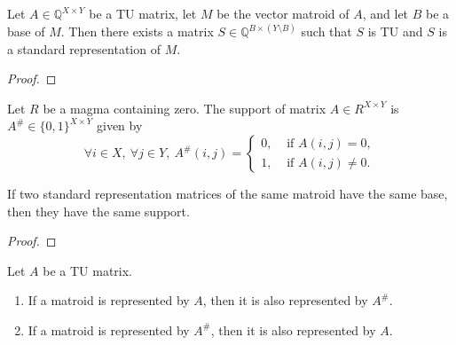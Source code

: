 
\begin{lemma}
    \label{VectorMatroid.exists_standardRepr_isBase_isTotallyUnimodular}
    \leanok
    Let $A \in \mathbb{Q}^{X \times Y}$ be a TU matrix, let $M$ be the vector matroid of $A$, and let $B$ be a base of $M$. Then there exists a matrix $S \in \mathbb{Q}^{B \times (Y \setminus B)}$ such that $S$ is TU and $S$ is a standard representation of $M$.
\end{lemma}

\begin{proof}
    \leanok
    \SeeLean
\end{proof}


\begin{definition}
    \label{Matrix.support}
    \leanok
    Let $R$ be a magma containing zero. The support of matrix $A \in R^{X \times Y}$ is $A^{\#} \in \{0, 1\}^{X \times Y}$ given by
    \[
        \forall i \in X, \ \forall j \in Y, \ A^{\#} (i, j) = \begin{cases}
            0, & \text{ if } A (i, j) = 0, \\
            1, & \text{ if } A (i, j) \neq 0.
        \end{cases}
    \]
\end{definition}

\begin{lemma}
    \label{support_eq_support_of_same_matroid_same_X}
    \leanok
    If two standard representation matrices of the same matroid have the same base, then they have the same support.
\end{lemma}

\begin{proof}
    \leanok
    \SeeLean
\end{proof}

\begin{lemma}
    \label{Matrix.IsTotallyUnimodular.toMatroid_eq_support_toMatroid}
    \leanok
    Let $A$ be a TU matrix.
    \begin{enumerate}
        \item If a matroid is represented by $A$, then it is also represented by $A^{\#}$.
        \item If a matroid is represented by $A^{\#}$, then it is also represented by $A$.
    \end{enumerate}
\end{lemma}

